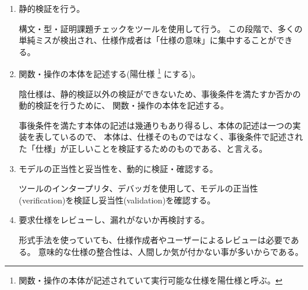 \begin{enumerate}
\item 静的検証を行う。

	構文・型・証明課題チェックをツールを使用して行う。
	この段階で、多くの単純ミスが検出され、仕様作成者は「仕様の意味」に集中することができる。
	

\item 関数・操作の本体を記述する(陽仕様
		\footnote{関数・操作の本体が記述されていて実行可能な仕様を陽仕様と呼ぶ。}
	にする)。

	陰仕様は、静的検証以外の検証ができないため、事後条件を満たすか否かの動的検証を行うために、
	関数・操作の本体を記述する。

	事後条件を満たす本体の記述は幾通りもあり得るし、本体の記述は一つの実装を表しているので、
	本体は、仕様そのものではなく、事後条件で記述された「仕様」が正しいことを検証するためのものである、と言える。
	

\item モデルの正当性と妥当性を、動的に検証・確認する。

	ツールのインタープリタ、デバッガを使用して、モデルの正当性(verification)を検証し妥当性(validation)を確認する。

\item 要求仕様をレビューし、漏れがないか再検討する。

	形式手法を使っていても、仕様作成者やユーザーによるレビューは必要である。
	意味的な仕様の整合性は、人間しか気が付かない事が多いからである。
\end{enumerate}